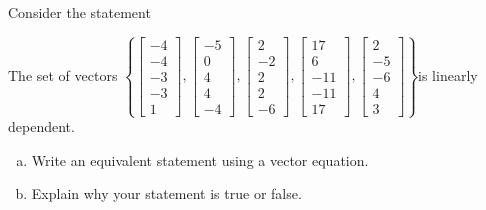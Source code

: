
\begin{exerciseStatement}


Consider the statement 
\begin{center}\begin{minipage}{0.8\textwidth}
 The set of vectors \( \left\{ \left[\begin{array}{c}
-4 \\
-4 \\
-3 \\
-3 \\
1
\end{array}\right] , \left[\begin{array}{c}
-5 \\
0 \\
4 \\
4 \\
-4
\end{array}\right] , \left[\begin{array}{c}
2 \\
-2 \\
2 \\
2 \\
-6
\end{array}\right] , \left[\begin{array}{c}
17 \\
6 \\
-11 \\
-11 \\
17
\end{array}\right] , \left[\begin{array}{c}
2 \\
-5 \\
-6 \\
4 \\
3
\end{array}\right] \right\} \)is linearly dependent.
\end{minipage}\end{center}
    


\begin{enumerate}[(a)]
\item  Write an equivalent statement using a vector equation.
\item  Explain why your statement is true or false.
\end{enumerate}
    
\end{exerciseStatement}
    
